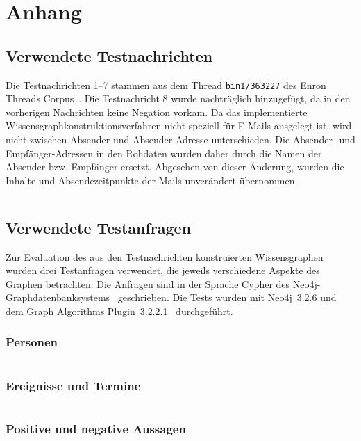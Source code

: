 
\chapter{Anhang}%
\label{sec:appendix}

\section{Verwendete Testnachrichten}%
\label{sec:appendix:msgs}

Die Testnachrichten 1--7 stammen aus dem Thread \texttt{bin1/363227} des Enron Threads Corpus~\cite{EnronThreads}.
Die Testnachricht 8 wurde nachträglich hinzugefügt, da in den vorherigen Nachrichten keine Negation vorkam.
Da das implementierte Wissensgraphkonstruktionsverfahren nicht speziell für E-Mails ausgelegt ist, wird nicht zwischen Absender und Absender-Adresse unterschieden.
Die Absender- und Empfänger-Adressen in den Rohdaten wurden daher durch die Namen der Absender bzw. Empfänger ersetzt.
Abgesehen von dieser Änderung, wurden die Inhalte und Absendezeitpunkte der Mails unverändert übernommen.
\inputminted{clojure}{data/evaluation/testdata.clj}

\section{Verwendete Testanfragen}%
\label{sec:appendix:queries}

Zur Evaluation des aus den Testnachrichten konstruierten Wissensgraphen wurden drei Testanfragen verwendet, die jeweils verschiedene Aspekte des Graphen betrachten.
Die Anfragen sind in der Sprache Cypher des Neo4j-Graphdatenbanksystems~\cite{Neo4j} geschrieben.
Die Tests wurden mit Neo4j~3.2.6 und dem Graph Algorithms Plugin~3.2.2.1~\cite{GraphAlgo} durchgeführt.

\subsection{Personen}%
\label{sec:appendix:queries:people}
\inputminted{cypher}{data/evaluation/people.cql}

\subsection{Ereignisse und Termine}%
\label{sec:appendix:queries:events}
\inputminted{cypher}{data/evaluation/personTimeAction.cql}

\subsection{Positive und negative Aussagen}%
\label{sec:appendix:queries:neg}
\inputminted{cypher}{data/evaluation/personNegationAction.cql}
